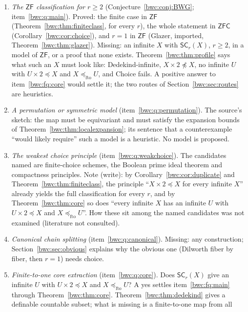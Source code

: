 \documentclass[11pt,letterpaper]{article}
\numberwithin{equation}{section}
\theoremstyle{plain}
\theoremstyle{definition}
\theoremstyle{remark}
\newcommand{\SC}{\mathsf{SC}}
\newcommand{\ZF}{\mathsf{ZF}}
\newcommand{\ZFC}{\mathsf{ZFC}}
\newcommand{\fto}{\preccurlyeq_{\mathrm{fto}}}
\begin{document}
\begin{enumerate}[label=F\arabic*.,ref=F\arabic*]
\item\label{bwc:fq:main} \emph{The $\ZF$ classification for $r\geq2$}
 (Conjecture~\ref{bwc:conj:BWG}; item~\ref{bwc:q:main}). Proved: the finite
 case in $\ZF$ (Theorem~\ref{bwc:thm:finiteclass}, for every $r$), the whole
 statement in $\ZFC$ (Corollary~\ref{bwc:cor:choice}), and $r=1$ in $\ZF$
 (Glazer, imported, Theorem~\ref{bwc:thm:glazer}). Missing: an infinite $X$
 with $\SC_r(X)$, $r\geq2$, in a model of $\ZF$, or a proof that none exists.
 Theorem~\ref{bwc:thm:profile} says what such an $X$ must look like:
 Dedekind-infinite, $X\times2\not\preccurlyeq X$, no infinite $U$ with
 $U\times2\preccurlyeq X$ and $X\fto U$, and Choice fails. A positive answer
 to item~\ref{bwc:fq:core} would settle it; the two routes of
 Section~\ref{bwc:sec:routes} are heuristics.
\item\label{bwc:fq:permutation} \emph{A permutation or symmetric model}
 (item~\ref{bwc:q:permutation}). The source's sketch: the map must be
 equivariant and must satisfy the expansion bounds of
 Theorem~\ref{bwc:thm:localexpansion}; its sentence that a counterexample
 ``would likely require'' such a model is a heuristic. No model is proposed.
\item\label{bwc:fq:weakchoice} \emph{The weakest choice principle}
 (item~\ref{bwc:q:weakchoice}). The candidates named are finite-choice
 schemes, the Boolean prime ideal theorem and compactness principles. Note
 (write): by Corollary~\ref{bwc:cor:duplicate} and
 Theorem~\ref{bwc:thm:finiteclass}, the principle ``$X\times2\preccurlyeq X$
 for every infinite $X$'' already yields the full classification for every
 $r$, and by Theorem~\ref{bwc:thm:core} so does ``every infinite $X$ has an
 infinite $U$ with $U\times2\preccurlyeq X$ and $X\fto U$''. How these sit
 among the named candidates was not examined (literature not consulted).
\item\label{bwc:fq:canonical} \emph{Canonical chain splitting}
 (item~\ref{bwc:q:canonical}). Missing: any construction; Section~\ref{bwc:sec:obvious} explains
 why the obvious one (Dilworth fiber by fiber, then $r=1$) needs choice.
\item\label{bwc:fq:core} \emph{Finite-to-one core extraction}
 (item~\ref{bwc:q:core}). Does $\SC_r(X)$ give an infinite $U$ with
 $U\times2\preccurlyeq X$ and $X\fto U$? A yes settles item~\ref{bwc:fq:main}
 through Theorem~\ref{bwc:thm:core}. Theorem~\ref{bwc:thm:dedekind} gives a
 definable countable subset; what is missing is a finite-to-one map from all

\end{enumerate}
\end{document}
